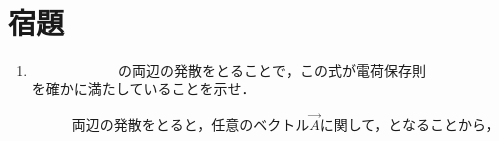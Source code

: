 
\section{宿題}

\begin{enumerate}
    \item $$の両辺の発散をとることで，この式が電荷保存則$$を確かに満たしていることを示せ．
    \begin{description}
        \item[] 両辺の発散をとると，任意のベクトル$\vec{A}$に関して，$$となることから，
    \end{description}
\end{enumerate}